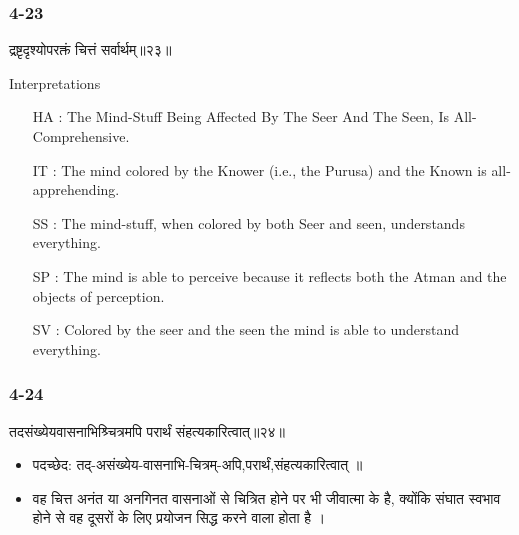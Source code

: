\begin{frame}[fragile]\frametitle{4-23}
\begin{sanskrit}
द्रष्टृदृश्योपरक्तं चित्तं सर्वार्थम्॥२३॥
\end{sanskrit}

Interpretations
\begin{itemize}	
\item [HA]: The Mind-Stuff Being Affected By The Seer And The Seen, Is All-Comprehensive.
\item [IT]: The mind colored by the Knower (i.e., the Purusa) and the Known is all-apprehending.
\item [SS]: The mind-stuff, when colored by both Seer and seen, understands everything.
\item [SP]: The mind is able to perceive because it reflects both the Atman and the objects of perception.
\item [SV]: Colored by the seer and the seen the mind is able to understand everything.
\end{itemize}
\end{frame}

\begin{frame}[fragile]\frametitle{4-24}
\begin{sanskrit}
तदसंख्येयवासनाभिश्र्चित्रमपि परार्थं संहत्यकारित्वात्॥२४॥
\end{sanskrit}

\begin{itemize}
\item पदच्छेद:  तद्-असंख्येय-वासनाभि-चित्रम्-अपि,परार्थं,‌संहत्यकारित्वात्‌ ॥
\item  वह चित्त अनंत या अनगिनत वासनाओं से चित्रित होने पर भी जीवात्मा के है, क्योंकि संघात स्वभाव होने से वह दूसरों के लिए प्रयोजन सिद्ध करने वाला होता है ।
\end{itemize}
\end{frame}


